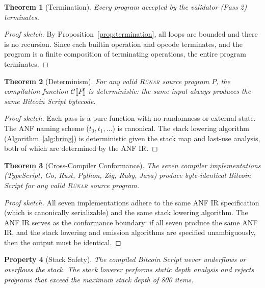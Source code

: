 \documentclass[11pt,a4paper]{article}
\newtheorem{theorem}{Theorem}[section]
\newtheorem{property}[theorem]{Property}
\newcommand{\runar}{\textsc{Rúnar}}
\newcommand{\compile}[1]{\mathcal{C}\llbracket #1 \rrbracket}
\begin{document}
\begin{theorem}[Termination]
\label{thm:termination}
Every program accepted by the validator (Pass 2) terminates.
\end{theorem}

\begin{proof}[Proof sketch]
By Proposition~\ref{prop:termination}, all loops are bounded and there is
no recursion. Since each builtin operation and opcode terminates, and the
program is a finite composition of terminating operations, the entire
program terminates.
\end{proof}

\begin{theorem}[Determinism]
\label{thm:determinism}
For any valid \runar{} source program $P$, the compilation function
$\compile{P}$ is deterministic: the same input always produces the same
Bitcoin Script bytecode.
\end{theorem}

\begin{proof}[Proof sketch]
Each pass is a pure function with no randomness or external state. The
ANF naming scheme ($t_0, t_1, \ldots$) is canonical. The stack lowering
algorithm (Algorithm~\ref{alg:bring}) is deterministic given the stack
map and last-use analysis, both of which are determined by the ANF IR.
\end{proof}

\begin{theorem}[Cross-Compiler Conformance]
\label{thm:conformance}
The seven compiler implementations (TypeScript, Go, Rust, Python, Zig, Ruby, Java)
produce byte-identical Bitcoin Script for any valid \runar{} source program.
\end{theorem}

\begin{proof}[Proof sketch]
All seven implementations adhere to the same ANF IR specification (which
is canonically serializable) and the same stack lowering algorithm. The
ANF IR serves as the conformance boundary: if all seven produce the same
ANF IR, and the stack lowering and emission algorithms are specified
unambiguously, then the output must be identical.
\end{proof}

\begin{property}[Stack Safety]
\label{prop:stack-safety}
The compiled Bitcoin Script never underflows or overflows the stack.
The stack lowerer performs static depth analysis and rejects programs that
exceed the maximum stack depth of 800 items.
\end{property}
\end{document}
